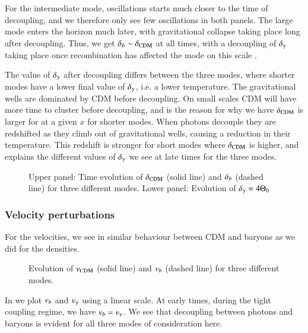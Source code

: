 For the intermediate mode, oscillations starts much closer to the time of decoupling, and we therefore only see few oscillations in both panels. The large mode enters the horizon much later, with gravitational collapse taking place long after decoupling. Thus, we get $\delta_b\sim\delta_\mathrm{CDM}$ at all times, with a decoupling of $\delta_\gamma$ taking place once recombination has affected the mode on this scale . 

The value of $\delta_\gamma$ after decoupling differs between the three modes, where shorter modes have a lower final value of $\delta_\gamma$, i.e. a lower temperature. The gravitational wells are dominated by CDM before decoupling. On small scales CDM will have more time to cluster before decoupling, and is the reason for why we have $\delta_\mathrm{CDM}$ is larger for at a given $x$ for shorter modes. When photons decouple they are redshifted as they climb out of gravitational wells, causing a reduction in their temperature. This redshift is stronger for short modes where $\delta_\mathrm{CDM}$ is higher, and explains the different values of $\delta_\gamma$ we see at late times for the three modes. 


\begin{figure}[ht!]
    \caption{Upper panel: Time evolution of $\delta_\mathrm{CDM}$ (solid line) and $\delta_b$ (dashed line) for three different modes. Lower panel: Evolution of $\delta_\gamma=4\Theta_0$}
    \label{fig:M3:results:deltas}
\end{figure}


\subsubsection{Velocity perturbations}\label{sssec:M3:results:velocity_perturbations}
For the velocities, we see in  similar behaviour between CDM and baryons as we did for the densities. 

\begin{figure}[ht!]
    \caption{Evolution of $v_\mathrm{CDM}$ (solid line) and $v_b$ (dashed line) for three different modes.}
    \label{fig:M3:results:vel_CDM_b}
\end{figure}

In  we plot $v_b$ and $v_\gamma$ using a linear scale. At early times, during the tight coupling regime, we have $v_b=v_\gamma$. We see that decoupling between photons and baryons is evident for all three modes of consideration here.  


